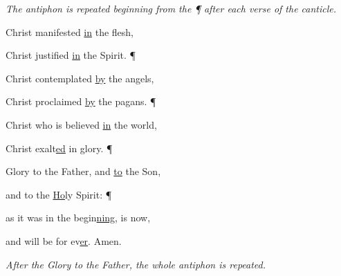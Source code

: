 \emph{The antiphon is repeated beginning from the \emph{¶} after each verse of the canticle.} \vspace{5pt}

\noindent Christ manifested \uline{in} the flesh,~\GreStar{}~\nopagebreak

Christ justified \uline{in} the Spirit. ¶

\noindent Christ contemplated \uline{by} the angels,~\GreStar{}~\nopagebreak

Christ proclaimed \uline{by} the pagans. ¶

\noindent Christ who is believed \uline{in} the world,~\GreStar{}~\nopagebreak

Christ exalt\uline{ed} in glory. ¶

\noindent Glory to the Father, and \uline{to} the Son,~\GreStar{}~\nopagebreak

and to the \uline{Ho}ly Spirit: ¶

\noindent as it was in the begin\uline{ning}, is now,~\GreStar{}~\nopagebreak

and will be for ev\uline{er}. Amen.

\vspace{5pt} \emph{After the \emph{Glory to the Father,} the whole antiphon is repeated.}
